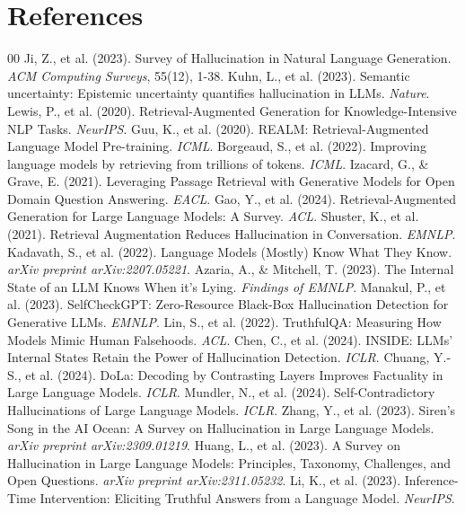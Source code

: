 \documentclass[10pt,journal,compsoc]{IEEEtran}
\begin{document}
\section{References}
\begin{thebibliography}{00}
 Ji, Z., et al. (2023). Survey of Hallucination in Natural Language Generation. \textit{ACM Computing Surveys}, 55(12), 1-38.
 Kuhn, L., et al. (2023). Semantic uncertainty: Epistemic uncertainty quantifies hallucination in LLMs. \textit{Nature}.
 Lewis, P., et al. (2020). Retrieval-Augmented Generation for Knowledge-Intensive NLP Tasks. \textit{NeurIPS}.
 Guu, K., et al. (2020). REALM: Retrieval-Augmented Language Model Pre-training. \textit{ICML}.
 Borgeaud, S., et al. (2022). Improving language models by retrieving from trillions of tokens. \textit{ICML}.
 Izacard, G., \& Grave, E. (2021). Leveraging Passage Retrieval with Generative Models for Open Domain Question Answering. \textit{EACL}.
 Gao, Y., et al. (2024). Retrieval-Augmented Generation for Large Language Models: A Survey. \textit{ACL}.
 Shuster, K., et al. (2021). Retrieval Augmentation Reduces Hallucination in Conversation. \textit{EMNLP}.
 Kadavath, S., et al. (2022). Language Models (Mostly) Know What They Know. \textit{arXiv preprint arXiv:2207.05221}.
 Azaria, A., \& Mitchell, T. (2023). The Internal State of an LLM Knows When it's Lying. \textit{Findings of EMNLP}.
 Manakul, P., et al. (2023). SelfCheckGPT: Zero-Resource Black-Box Hallucination Detection for Generative LLMs. \textit{EMNLP}.
 Lin, S., et al. (2022). TruthfulQA: Measuring How Models Mimic Human Falsehoods. \textit{ACL}.
 Chen, C., et al. (2024). INSIDE: LLMs' Internal States Retain the Power of Hallucination Detection. \textit{ICLR}.
 Chuang, Y.-S., et al. (2024). DoLa: Decoding by Contrasting Layers Improves Factuality in Large Language Models. \textit{ICLR}.
 Mundler, N., et al. (2024). Self-Contradictory Hallucinations of Large Language Models. \textit{ICLR}.
 Zhang, Y., et al. (2023). Siren's Song in the AI Ocean: A Survey on Hallucination in Large Language Models. \textit{arXiv preprint arXiv:2309.01219}.
 Huang, L., et al. (2023). A Survey on Hallucination in Large Language Models: Principles, Taxonomy, Challenges, and Open Questions. \textit{arXiv preprint arXiv:2311.05232}.
 Li, K., et al. (2023). Inference-Time Intervention: Eliciting Truthful Answers from a Language Model. \textit{NeurIPS}.

\end{thebibliography}
\end{document}
